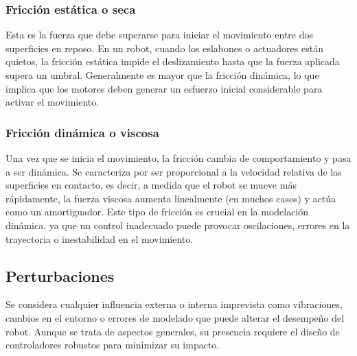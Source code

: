 \subsubsection{Fricción estática o seca}
Esta es la fuerza que debe superarse para iniciar el movimiento entre dos superficies en reposo. En un robot, cuando los eslabones o actuadores están quietos, la fricción estática impide el deslizamiento hasta que la fuerza aplicada supera un umbral. Generalmente es mayor que la fricción dinámica, lo que implica que los motores deben generar un esfuerzo inicial considerable para activar el movimiento.

\subsubsection{Fricción dinámica o viscosa}
Una vez que se inicia el movimiento, la fricción cambia de comportamiento y pasa a ser dinámica. Se caracteriza por ser proporcional a la velocidad relativa de las superficies en contacto, es decir, a medida que el robot se mueve más rápidamente, la fuerza viscosa aumenta linealmente (en muchos casos) y actúa como un amortiguador. Este tipo de fricción es crucial en la modelación dinámica, ya que un control inadecuado puede provocar oscilaciones, errores en la trayectoria o inestabilidad en el movimiento.

\subsection{Perturbaciones}
Se considera cualquier influencia externa o interna imprevista como vibraciones, cambios en el entorno o errores de modelado que puede alterar el desempeño del robot. Aunque se trata de aspectos generales, su presencia requiere el diseño de controladores robustos para minimizar su impacto.